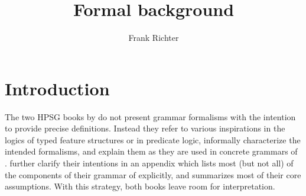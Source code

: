 \documentclass[output=paper,biblatex,babelshorthands,newtxmath,draftmode,colorlinks,citecolor=brown]{langscibook}
\author{Frank Richter\affiliation{Goethe Universität Frankfurt}}
\title{Formal background}
\begin{document}
\maketitle
\label{chap-formal-background}

\section{Introduction}
\label{sec-introduction}

The two HPSG books by \citet{PollardSag1987,PollardSag1994} do not present grammar formalisms
with the intention to provide precise definitions.
Instead they refer to various inspirations in the
logics of typed feature structures or in predicate logic, informally
characterize the intended formalisms, and explain them as they are
used in concrete grammars of . \citet{PollardSag1994} further clarify
their intentions in an appendix which lists most (but not all) of the components
of their grammar of  explicitly, and summarizes most of their core
assumptions. With this strategy, both books leave room for
interpretation.
\end{document}
